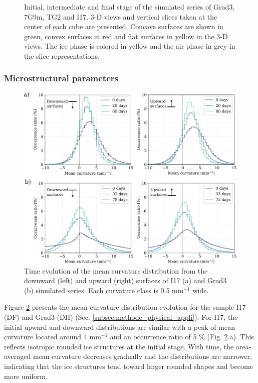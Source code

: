 \documentclass[draft,ms]{agujournal2019}
\begin{document}
\begin{figure}
    \centering
    \caption{Initial, intermediate and final stage of the simulated series of Grad3, 7G9m, TG2 and I17. 3-D views and vertical slices taken at the center of each cube are presented. Concave surfaces are shown in green, convex surfaces in red and flat surfaces in yellow in the 3-D views. The ice phase is colored in yellow and the air phase in grey in the slice representations.}
    \label{fig:evolutions_3D}
\end{figure}

\subsubsection{Microstructural parameters}

\begin{figure}
    \centering
    \includegraphics[width=\linewidth]{Figures/histo_i17_grad3_copie_invert.pdf}
    \caption{Time evolution of the mean curvature distribution from the downward (left) and upward (right) surfaces of I17 (a) and Grad3 (b) simulated series. Each curvature class is 0.5 mm$^{-1}$ wide.}
    \label{fig:histo_i17_grad3}
\end{figure}

Figure \ref{fig:histo_i17_grad3} presents the mean curvature distribution evolution for the sample I17 (DF) and Grad3 (DH) (Sec. \ref{subsec:methode_physical_appli}). For I17, the initial upward and downward distributions are similar with a peak of mean curvature located around 4 mm$^{-1}$ and an occurrence ratio of 5 \% (Fig. \ref{fig:histo_i17_grad3}.a). This reflects isotropic rounded ice structures at the initial stage. With time, the area-averaged mean curvature decreases gradually and the distributions are narrower, indicating that the ice structures tend toward larger rounded shapes and become more uniform.\\
\end{document}
